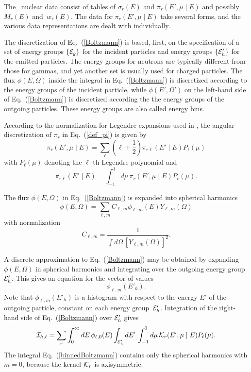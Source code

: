 The \xendl\ nuclear data consist
of tables of $\sigma_r(E)$ and $\pi_r(E', \mu \mid E)$ and possibly
$M_r(E)$ and~$w_r(E)$.
The data for $\pi_r(E', \mu \mid E)$ take several forms, and
the various data representations are dealt with individually.

The discretization of Eq.~(\ref{Boltzmann}) is based, first,
on the specification of a set of energy groups $\{ {\cal E}_g
\}$ for the incident particles and energy groups $\{ {\cal E}'_h
\}$ for the emitted particles.  The energy groups for
neutrons are typically different from those for gammas,
and yet another set is usually used for charged particles.
The flux $\phi(E, \Omega)$ inside the integral in
Eq.~(\ref{Boltzmann}) is discretized according to the energy
groups of the incident particle, while $\phi(E', \Omega')$
on the left-hand side of Eq.~(\ref{Boltzmann}) is discretized
according the the energy groups of the outgoing particles.
These energy groups are also called energy bins.

According to the normalization for Legendre expansions used in \xendl,
the angular discretization of $\pi_r$ in Eq.~(\ref{def_pi}) is 
given by
$$
  \pi_r( E', \mu \mid E) =
   \sum_\ell 
   \left(
     \ell + \frac{1}{2}
   \right)
   \pi_{r\ell}( E' \mid E) P_\ell( \mu)
$$
with $P_\ell( \mu)$ denoting the $\ell$-th Legendre polynomial
and
\begin{equation}
  \pi_{r\ell}( E' \mid E) =
  \int_{-1}^1 d\mu \, \pi_r( E', \mu \mid E) P_\ell( \mu).
  \label{def_piell}
\end{equation}

The flux $\phi(E, \Omega)$ in Eq.~(\ref{Boltzmann}) is expanded 
into spherical harmonics
\begin{equation}
  \phi(E, \Omega) =
  \sum_{\ell, m}
    C_{\ell, m} \phi_{\ell, m}(E) Y_{\ell, m} (\Omega)
 \label{sphHarmonics}
\end{equation}
with normalization
$$
  C_{\ell, m} = \frac{1}{\int d\Omega \, [Y_{\ell, m} (\Omega)]^2}.
$$

A discrete approximation to Eq.~(\ref{Boltzmann}) may be obtained
by expanding $\phi(E, \Omega)$ in spherical harmonics and integrating
over the outgoing energy group~${\cal E}'_h$.
This gives an
equation for the vector of values
$$
  \phi_{\ell, m}(E'_h).
$$
Note that $\phi_{\ell, m}(E'_h)$ is a histogram with respect to
the energy $E'$ of the outgoing particle, constant on each energy
group~${\cal E}'_h$.
Integration of the
right-hand side of Eq.~(\ref{Boltzmann}) over ${\cal E}'_h$ gives
\begin{equation}
  {\cal I}_{h,\ell} = \sum_r
  \int_0^\infty dE \, \phi_{\ell, 0}(E)
  \int_{{\cal E}'_h } dE' \, \int_{-1}^1 d\mu \,
  {\cal K}_r(E', \mu \mid E) P_\ell( \mu ).
  \label{binnedBoltzmann}
\end{equation}
The integral Eq.~(\ref{binnedBoltzmann}) contains only the spherical
harmonics with $m = 0$, because the kernel ${\cal K}_r$ is axisymmetric.

